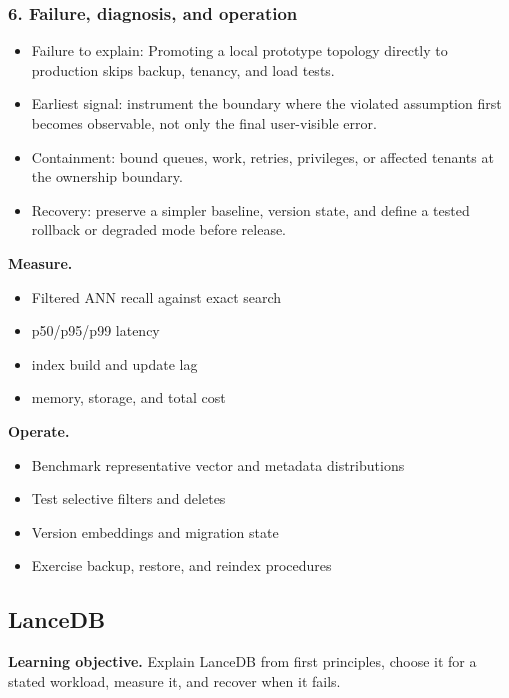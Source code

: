 \subsubsection*{6. Failure, diagnosis, and operation}
\begin{itemize}
\item Failure to explain: Promoting a local prototype topology directly to production skips backup, tenancy, and load tests.
\item Earliest signal: instrument the boundary where the violated assumption first becomes observable, not only the final user-visible error.
\item Containment: bound queues, work, retries, privileges, or affected tenants at the ownership boundary.
\item Recovery: preserve a simpler baseline, version state, and define a tested rollback or degraded mode before release.
\end{itemize}
\textbf{Measure.}\begin{itemize}
\item Filtered ANN recall against exact search
\item p50/p95/p99 latency
\item index build and update lag
\item memory, storage, and total cost
\end{itemize}
\textbf{Operate.}\begin{itemize}
\item Benchmark representative vector and metadata distributions
\item Test selective filters and deletes
\item Version embeddings and migration state
\item Exercise backup, restore, and reindex procedures
\end{itemize}
\subsection{LanceDB}
\textbf{Learning objective.} Explain LanceDB from first principles, choose it for a stated workload, measure it, and recover when it fails.
